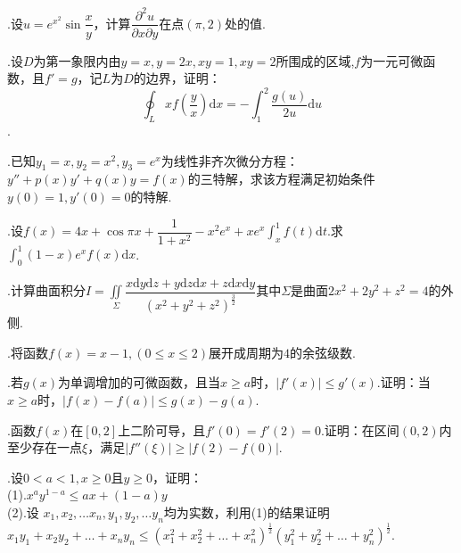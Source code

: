 \documentclass[UTF8]{ctexart}
\begin{document}
.设$u=e^{x^{2}}\sin\dfrac{x}{y}$，计算$\dfrac{\partial^{2}u}{\partial x\partial y}$在点$\left(\pi,2\right)$处的值.


.设$D$为第一象限内由$y=x,y=2x,xy=1,xy=2$所围成的区域,$f$为一元可微函数，且$f'=g$，记$L$为$D$的边界，证明：
\[\oint_{L}xf\left(\frac{y}{x}\right)\mathrm{d}x=-\int_{1}^{2}\frac{g\left(u\right)}{2u}\mathrm{d}u\].


.已知$y_{1}=x,y_{2}=x^{2},y_{3}=e^x$为线性非齐次微分方程：$ y''+p(x)y'+q(x)y=f(x) $的三特解，求该方程满足初始条件$ y(0)=1,y'(0)=0 $的特解.


.设$ f(x)=4x+\cos{\pi}{x}+\dfrac{1}{1+x^2}-x^2e^x+xe^x\int_{x}^{1}f(t)\mathrm{d}t $.求$ \int_{0}^{1}(1-x)e^xf(x)\mathrm{d}x $.


.计算曲面积分$ I=\underset{\Sigma}\iint\dfrac{x\mathrm{d}y\mathrm{d}z+y\mathrm{d}z\mathrm{d}x+z\mathrm{d}x\mathrm{d}y}{(x^2+y^2+z^2)^\frac{3}{2}} $其中$ \Sigma $是曲面$ 2x^2+2y^2+z^2=4 $的外侧.


.将函数$ f(x)=x-1,(0\le{x}\le{2}) $展开成周期为$ 4 $的余弦级数.


.若$ g(x) $为单调增加的可微函数，且当$ x\ge{a} $时，$ \left|f'(x)\right|\le{g'(x)} $.证明：当$ x\ge{a} $时，$ \left|f(x)-f(a)\right|\le{g(x)-g(a)} $.


.函数$ f(x) $在$ [0,2] $上二阶可导，且$ f'(0)=f'(2)=0 $.证明：在区间$ (0,2) $内至少存在一点$ \xi $，满足$ \left|f''(\xi)\right|\ge\left|f(2)-f(0)\right| $.


.设$ 0<a<1,x\ge0 $且$ y\ge0 $，证明： \\(1).$x^ay^{1-a}\le{ax+(1-a)y} $\\
(2).设 $x_1,x_2,\ldots x_n,y_1,y_2,\ldots y_n $均为实数，利用(1)的结果证明$ x_1y_1+x_2y_2+\ldots +x_ny_n\le (x_1^2+x_2^2+\ldots+x_n^2)^\frac{1}{2} (y_1^2+y_2^2+\ldots+y_n^2)^\frac{1}{2}$.
\thispagestyle{empty}
\end{document}
